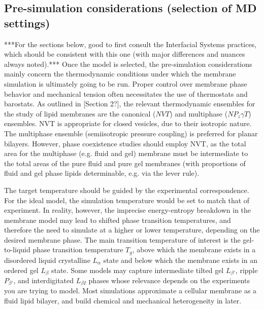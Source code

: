 \documentclass[9pt,bestpractices]{livecoms}
\begin{document}
\subsection{Pre-simulation considerations (selection of MD settings)}
***For the sections below, good to first consult the Interfacial Systems practices, which should be consistent with this one (with major differences and nuances always noted).***
Once the model is selected, the pre-simulation considerations mainly concern the thermodynamic conditions under which the membrane simulation is ultimately going to be run.
Proper control over membrane phase behavior and mechanical tension often necessitates the use of thermostats and barostats.
As outlined in [Section 2?], the relevant thermodynamic ensembles for the study of lipid membranes are the canonical ($NVT$) and multiphase ($NP_z \gamma T$) ensembles.
NVT is appropriate for closed vesicles, due to their isotropic nature.
The multiphase ensemble (semiisotropic pressure coupling) is preferred for planar bilayers.
However, phase coexistence studies should employ NVT, as the total area for the multiphase (e.g. fluid and gel) membrane must be intermediate to the total areas of the pure fluid and pure gel membranes (with proportions of fluid and gel phase lipids determinable, e.g. via the lever rule).

The target temperature should be guided by the experimental correspondence.
For the ideal model, the simulation temperature would be set to match that of experiment.
In reality, however, the imprecise energy-entropy breakdown in the membrane model may lead to shifted phase transition temperatures, and therefore the need to simulate at a higher or lower temperature, depending on the desired membrane phase.
The main transition temperature of interest is the gel-to-liquid phase transition temperature $T_g$, above which the membrane exists in a disordered liquid crystalline $L_\alpha$ state and below which the membrane exists in an ordered gel $L_\beta$ state.
Some models may capture intermediate tilted gel $L_{\beta '}$, ripple $P_{\beta '}$, and interdigitated $L_{\beta I}$ phases whose relevance depends on the experiments you are trying to model.
Most simulations approximate a cellular membrane as a fluid lipid bilayer, and build chemical and mechanical heterogeneity in later.
\end{document}
